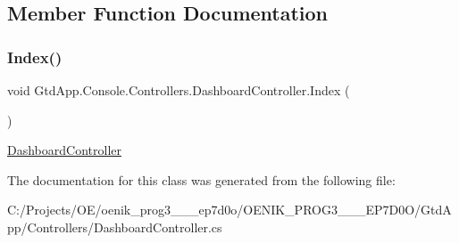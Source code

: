 \subsection{Member Function Documentation}
\mbox{\label{class_gtd_app_1_1_console_1_1_controllers_1_1_dashboard_controller_a3941276b17a18246e4c81c6abd9cebeb}} 
\subsubsection{\texorpdfstring{Index()}{Index()}}
{\footnotesize\ttfamily void Gtd\+App.\+Console.\+Controllers.\+Dashboard\+Controller.\+Index (\begin{DoxyParamCaption}{ }\end{DoxyParamCaption})}



\mbox{\hyperlink{class_gtd_app_1_1_console_1_1_controllers_1_1_dashboard_controller}{Dashboard\+Controller}} 



The documentation for this class was generated from the following file\+:\begin{DoxyCompactItemize}
\item 
C\+:/\+Projects/\+O\+E/oenik\+\_\+prog3\+\_\+\_\+\_\+ep7d0o/\+O\+E\+N\+I\+K\+\_\+\+P\+R\+O\+G3\+\_\+\_\+\_\+\+E\+P7\+D0\+O/\+Gtd\+App/\+Controllers/Dashboard\+Controller.\+cs\end{DoxyCompactItemize}
